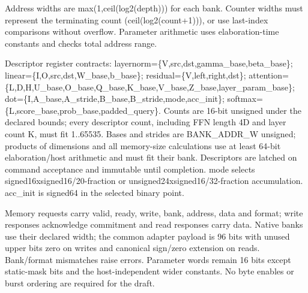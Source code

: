 \documentclass[11pt,a4paper]{article}
\begin{document}
Address widths are max(1,ceil(log2(depth))) for each bank. Counter widths must represent the terminating count (ceil(log2(count+1))), or use last-index comparisons without overflow. Parameter arithmetic uses elaboration-time constants and checks total address range.

Descriptor register contracts: layernorm=\{V,src,dst,gamma\_base,beta\_base\}; linear=\{I,O,src,dst,W\_base,b\_base\}; residual=\{V,left,right,dst\}; attention=\{L,D,H,U\_base,O\_base,Q\_base,K\_base,V\_base,Z\_base,layer\_param\_base\}; dot=\{I,A\_base,A\_stride,B\_base,B\_stride,mode,acc\_init\}; softmax=\{L,score\_base,prob\_base,padded\_query\}. Counts are 16-bit unsigned under the declared bounds; every descriptor count, including FFN length 4D and layer count K, must fit 1..65535. Bases and strides are BANK\_ADDR\_W unsigned; products of dimensions and all memory-size calculations use at least 64-bit elaboration/host arithmetic and must fit their bank. Descriptors are latched on command acceptance and immutable until completion. mode selects signed16xsigned16/20-fraction or unsigned24xsigned16/32-fraction accumulation. acc\_init is signed64 in the selected binary point.

Memory requests carry valid, ready, write, bank, address, data and format; write responses acknowledge commitment and read responses carry data. Native banks use their declared width; the common adapter payload is 96 bits with unused upper bits zero on writes and canonical sign/zero extension on reads. Bank/format mismatches raise errors. Parameter words remain 16 bits except static-mask bits and the host-independent wider constants. No byte enables or burst ordering are required for the draft.
\end{document}
